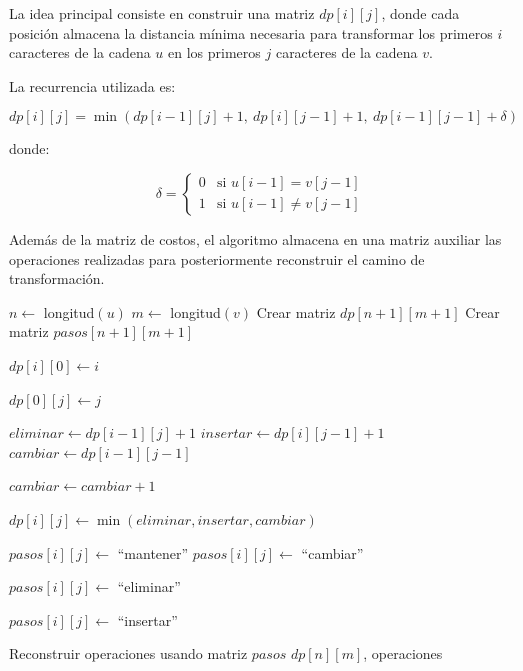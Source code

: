 \documentclass[12pt]{article}
\begin{document}
La idea principal consiste en construir una matriz \(dp[i][j]\), donde cada posición almacena la distancia mínima necesaria para transformar los primeros \(i\) caracteres de la cadena \(u\) en los primeros \(j\) caracteres de la cadena \(v\).

La recurrencia utilizada es:

$$dp[i][j] = \min\left(
dp[i-1][j] + 1,\
dp[i][j-1] + 1,\
dp[i-1][j-1] + \delta
\right)$$

donde:

\[
\delta =
\begin{cases}
0 & \text{si } u[i-1] = v[j-1] \\
1 & \text{si } u[i-1] \neq v[j-1]
\end{cases}
\]

Además de la matriz de costos, el algoritmo almacena en una matriz auxiliar las operaciones realizadas para posteriormente reconstruir el camino de transformación.

\begin{algorithm}[H]
\caption{Programación Dinámica con Tabulación}
\begin{algorithmic}[1]


    \State $n \gets$ longitud$(u)$
    \State $m \gets$ longitud$(v)$
    \State Crear matriz $dp[n+1][m+1]$
    \State Crear matriz $pasos[n+1][m+1]$
    
        \State $dp[i][0] \gets i$
    \EndFor
    
        \State $dp[0][j] \gets j$
    \EndFor



            \State $eliminar \gets dp[i-1][j] + 1$
            \State $insertar \gets dp[i][j-1] + 1$
            \State $cambiar \gets dp[i-1][j-1]$

                \State $cambiar \gets cambiar + 1$
            \EndIf

            \State $dp[i][j] \gets \min(eliminar,insertar,cambiar)$

            \If{$dp[i][j] = cambiar$}

                    \State $pasos[i][j] \gets$ ``mantener''
                \Else
                    \State $pasos[i][j] \gets$ ``cambiar''
                \EndIf

                \State $pasos[i][j] \gets$ ``eliminar''

            \Else
                \State $pasos[i][j] \gets$ ``insertar''
            \EndIf

        \EndFor

    \EndFor

    \State Reconstruir operaciones usando matriz $pasos$
    \State \Return $dp[n][m]$, operaciones

\EndFunction

\end{algorithmic}
\end{algorithm}
\end{document}
